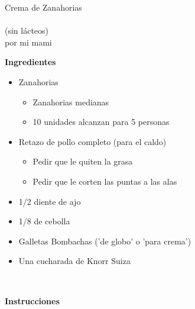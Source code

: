 \documentclass[letterpaper]{article}
\begin{document}
\begin{center}
{\Huge Crema de Zanahorias}\\\\

{\huge (sin lácteos)}\\

por mi mami\\
\end{center}

\hrulefill
\begin{center}
\textbf{\Large Ingredientes}\\
\end{center}
\hrulefill


\begin{itemize}
\item Zanahorias
	\begin{itemize}
		\item Zanahorias medianas
		\item 10 unidades alcanzan para 5 personas
	\end{itemize}
\item Retazo de pollo completo (para el caldo)
	\begin{itemize}
		\item Pedir que le quiten la grasa
		\item Pedir que le corten las puntas a las alas
	\end{itemize}
\item 1/2 diente de ajo 
\item 1/8 de cebolla
\item Galletas Bombachas ('de globo' o 'para crema')
\item Una cucharada de Knorr Suiza\\
\end{itemize}

\hrulefill \\
\begin{center}
\textbf{\Large Instrucciones}
\end{center}
\hrulefill
\end{document}
